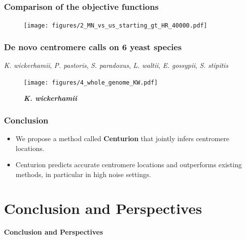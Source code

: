 \documentclass[xcolor=dvipsnames]{beamer}
\begin{document}
\begin{frame}
\frametitle{Comparison of the objective functions}

\begin{figure}
\texttt{[image: figures/2\_MN\_vs\_us\_starting\_gt\_HR\_40000.pdf]}
\end{figure}
\end{frame}

\begin{frame}
\frametitle{De novo centromere calls on 6 yeast species}

\textit{K. wickerhamii}, \textit{P. pastoris}, \textit{S. paradoxus}, \textit{L.
waltii}, \textit{E. gossypii}, \textit{S. stipitis}

\begin{figure}
\texttt{[image: figures/4\_whole\_genome\_KW.pdf]}

\caption{\textbf{\textit{K. wickerhamii}}}
\end{figure}

\end{frame}

\begin{frame}
\frametitle{Conclusion}
\begin{itemize}[label={$\bullet$}]
\item We propose a method called {\bf Centurion} that jointly infers
centromere locations.
\item Centurion predicts accurate centromere locations and outperforms
existing methods, in particular in high noise settings.
\end{itemize}
\end{frame}


\section{Conclusion and Perspectives}
\begin{frame}
\begin{center}
\huge{ \bf
Conclusion and Perspectives
}
\end{center}
\end{frame}

\end{document}
